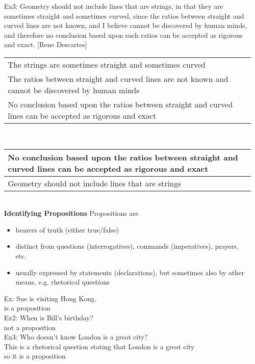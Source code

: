 Ex3: Geometry should not include lines that are strings, in that they are sometimes straight and sometimes curved, since the ratios between straight and curved lines are not known, and I believe cannot be discovered by human minds, and therefore no conclusion based upon such ratios can be accepted as rigorous and exact. [Rene Descartes]\\

\begin{tabular}{p{16cm}}
    The strings are sometimes straight and sometimes curved\\
    The ratios between straight and curved lines are not known and cannot be discovered by human minds\\
    \hline
    No conclusion based upon the ratios between straight and curved lines can be accepted as rigorous and exact
\end{tabular}\\

\begin{tabular}{p{16cm}}
    No conclusion based upon the ratios between straight and curved lines can be accepted as rigorous and exact\\
    \hline
    Geometry should not include lines that are strings
\end{tabular}\\

\textbf{Identifying Propositions}
Propositions are
\begin{itemize}
    \item bearers of truth (either true/false)
    \item distinct from questions (interrogatives), commands (imperatives), prayers, etc.
    \item usually expressed by statements (declarations), but sometimes also by other means, e.g. rhetorical questions
\end{itemize}
Ex: Sue is visiting Hong Kong.\\
is a proposition\\
Ex2: When is Bill's birthday?\\
not a proposition\\
Ex3: Who doesn't know London is a great city?\\
This is a rhetorical question stating that London is a great city\\
so it is a proposition\\

